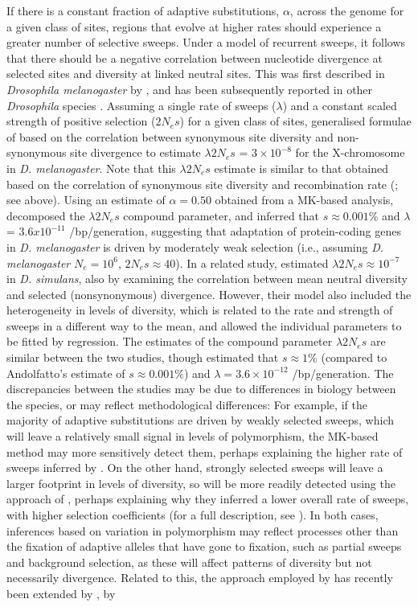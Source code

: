 If there is a constant fraction of adaptive substitutions, $\alpha$, across the genome for a given class of sites, regions that evolve at higher rates should experience a greater number of selective sweeps. Under a model of recurrent sweeps, it follows that there should be a negative correlation between nucleotide divergence at selected sites and diversity at linked neutral sites. This was first described in \textit{Drosophila melanogaster} by \cite{RN283}, and has been subsequently reported in other \textit{Drosophila} species \citep{RN284}. Assuming a single rate of sweeps ($\lambda$) and a constant scaled strength of positive selection ($2N_es$) for a given class of sites, \cite{RN283} generalised formulae of \cite{RN277} based on the correlation between synonymous site diversity and non-synonymous site divergence to estimate  $\lambda 2N_es$ = $3 \times 10^{-8}$ for the X-chromosome in \textit{D. melanogaster}. Note that this $\lambda 2N_es$ estimate is similar to that obtained based on the correlation of synonymous site diversity and recombination rate (\cite*{RN277}; see above). Using an estimate of $\alpha = 0.50$ obtained from a MK-based analysis, \cite{RN283} decomposed the $\lambda 2N_es$ compound parameter, and inferred that $s \approx 0.001\%$ and $\lambda$ = $3.6 x 10^{-11}$ /bp/generation, suggesting that adaptation of protein-coding genes in \textit{D. melanogaster} is driven by moderately weak selection (i.e., assuming \textit{D. melanogaster} $N_e =10^6$, $2N_es \approx 40$). In a related study, \cite{RN289} estimated $\lambda 2N_es \approx 10^{-7}$ in \textit{D. simulans}, also by examining the correlation between mean neutral diversity and selected (nonsynonymous) divergence. However, their model also included the heterogeneity in levels of diversity, which is related to the rate and strength of sweeps in a different way to the mean, and allowed the individual parameters to be fitted by regression. The estimates of the compound parameter $\lambda 2N_es$ are similar between the two studies, though \cite{RN289} estimated that $s \approx 1\%$ (compared to Andolfatto’s estimate of $s \approx 0.001 \%$) and $\lambda = 3.6 \times 10^{-12}$ /bp/generation. The discrepancies between the studies may be due to differences in biology between the species, or may reflect methodological differences: For example, if the majority of adaptive substitutions are driven by weakly selected sweeps, which will leave a relatively small signal in levels of  polymorphism, the MK-based method may more sensitively detect them, perhaps explaining the higher rate of sweeps inferred by \cite{RN283}. On the other hand, strongly selected sweeps will leave a larger footprint in levels of diversity, so will be more readily detected using the approach of \cite{RN289}, perhaps explaining why they inferred a lower overall rate of sweeps, with higher selection coefficients (for a full description, see \citealt{RN171}). In both cases, inferences based on variation in polymorphism may reflect processes other than the fixation of adaptive alleles that have gone to fixation, such as partial sweeps and background selection, as these will affect patterns of diversity but not necessarily divergence. Related to this, the approach employed by \cite{RN283} has recently been extended by \cite{RN323}, by 